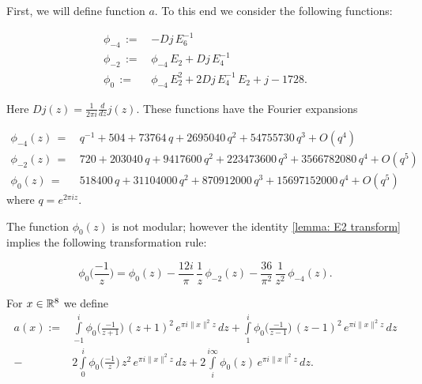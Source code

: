   First, we will define function $a$. To this end we consider the following functions:
  \begin{definition}\label{def: phi4 phi2 phi0}
  \begin{align}
    \phi_{-4}\,:= \,& -Dj\,E_6^{-1}\label{eqn: def phi4}\\
    \phi_{-2}\,:= \,&\phi_{-4}\,E_2+Dj\,E_4^{-1}\label{eqn: def phi2}\\
    \phi_{0}\,:= \,&\phi_{-4}\,E_2^2+2Dj\,E_4^{-1}\,E_2+j-1728.\label{eqn: def phi0}
  \end{align}
  \end{definition}
  Here $Dj(z)=\frac{1}{2\pi i} \frac{d}{dz} j(z)$.
  These functions have the Fourier expansions
  \begin{lemma}\label{lemma: phi fourier4 phi fourier2 phi fourier0}
  \begin{align}
    \phi_{-4}(z)\,=\,&q^{-1} + 504 + 73764\, q + 2695040\, q^2 + 54755730\, q^3 + O(q^4)\label{eqn: phi fourier4}\\
    \phi_{-2}(z)\,=\,&720 + 203040\, q + 9417600\, q^2 + 223473600\, q^3 + 3566782080\, q^4+O(q^5)\label{eqn: phi fourier2}\\
    \phi_{0}(z)\,=\,&518400\, q + 31104000\, q^2 + 870912000\, q^3 + 15697152000\, q^4+O(q^5)\label{eqn: phi fourier0}
  \end{align}
  where $q=e^{2\pi i z}$.
  \end{lemma}
  The function $\phi_0(z)$ is not modular; however the identity \ref{lemma: E2 transform} implies the following transformation rule:
  \begin{lemma}\label{lemma: phi0 transform}
  \begin{equation}\label{eqn: phi0 transform}
  \phi_0\Big(\frac{-1}{z}\Big)=\phi_0(z)-\frac{12i}{\pi}\,\frac{1}{z}\,\phi_{-2}(z)-\frac{36}{\pi^2}\,\frac{1}{z^2}\,\phi_{-4}(z).
  \end{equation}
  \end{lemma}
  \begin{definition}\label{def: a(r) definition}
  For $x\in\mathbb{R}^8$ we define
  \begin{align}\label{eqn: a(r) definition}
    a(x):=&\int\limits_{-1}^i\phi_0\Big(\frac{-1}{z+1}\Big)\,(z+1)^2\,e^{\pi i \|x\|^2 z}\,dz
    +\int\limits_{1}^i\phi_0\Big(\frac{-1}{z-1}\Big)\,(z-1)^2\,e^{\pi i \|x\|^2 z}\,dz\\
    -&2\int\limits_{0}^i\phi_0\Big(\frac{-1}{z}\Big)\,z^2\,e^{\pi i \|x\|^2 z}\,dz
    +2\int\limits_{i}^{i\infty}\phi_0(z)\,e^{\pi i \|x\|^2 z}\,dz.\nonumber
  \end{align}
  \end{definition}
